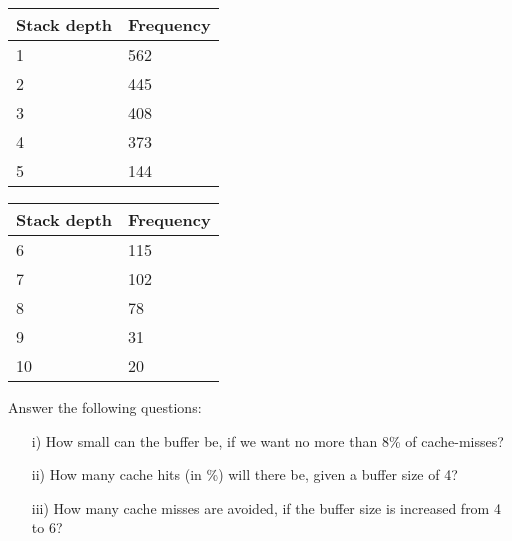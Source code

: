 \begin{enumerate}
        \begin{center}
          \begin{minipage}{0.31\columnwidth}
            \begin{tabular}{|p{2cm}|p{2cm}|} \hline
              {\bf Stack depth} & {\bf Frequency} \\ \hline \hline
              1                 & 562             \\ \hline
              2                 & 445             \\ \hline
              3                 & 408             \\ \hline
              4                 & 373             \\ \hline
              5                 & 144             \\ \hline
            \end{tabular}
          \end{minipage}
          \begin{minipage}{0.31\columnwidth}
            \begin{tabular}{|p{2cm}|p{2cm}|} \hline
              {\bf Stack depth} & {\bf Frequency} \\ \hline \hline
              6                 & 115             \\ \hline
              7                 & 102             \\ \hline
              8                 & 78              \\ \hline
              9                 & 31              \\ \hline
              10                & 20              \\ \hline
            \end{tabular}
          \end{minipage}
        \end{center}

        Answer the following questions:
        \begin{enumerate}
          \item[i)] How small can the buffer be, if we want no more than 8\% of cache-misses?

          \item[ii)] How many cache hits (in \%) will there be, given a buffer size of 4?

          \item[iii)] How many cache misses are avoided, if the buffer size is increased from 4 to 6?

        \end{enumerate}

\end{enumerate}

